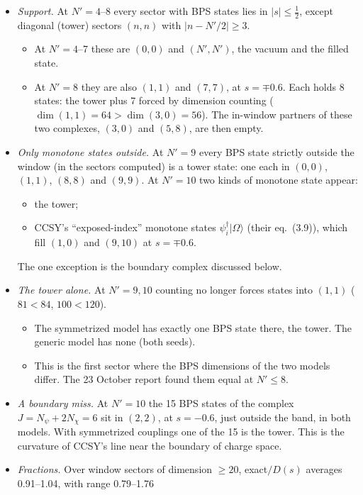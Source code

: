 \documentclass[11pt]{article}
\newcommand{\Np}{N'}
\newcommand{\Om}{|\Omega\rangle}
\theoremstyle{plain}
\theoremstyle{remark}
\numberwithin{equation}{section}
\begin{document}
\begin{itemize}\itemsep2pt
\item \emph{Support.} At $\Np=4$--8 every sector with BPS states lies in $|s|\le\tfrac12$, except diagonal (tower)
  sectors $(n,n)$ with $|n-\Np/2|\ge3$.
  \begin{itemize}\itemsep1pt
  \item At $\Np=4$--7 these are $(0,0)$ and $(\Np,\Np)$, the vacuum and the filled state.
  \item At $\Np=8$ they are also $(1,1)$ and $(7,7)$, at $s=\mp0.6$. Each holds 8 states: the tower plus 7 forced by
    dimension counting ($\dim(1,1)=64>\dim(3,0)=56$). The in-window partners of these two complexes, $(3,0)$ and $(5,8)$,
    are then empty.
  \end{itemize}
\item \emph{Only monotone states outside.} At $\Np=9$ every BPS state strictly outside the window (in the sectors computed)
  is a tower state: one each in $(0,0)$, $(1,1)$, $(8,8)$ and $(9,9)$. At $\Np=10$ two kinds of monotone state appear:
  \begin{itemize}\itemsep1pt
  \item the tower;
  \item CCSY's ``exposed-index'' monotone states $\psi_i^\dagger\Om$ (their eq.~(3.9)), which fill $(1,0)$ and $(9,10)$ at
    $s=\mp0.6$.
  \end{itemize}
  The one exception is the boundary complex discussed below.
\item \emph{The tower alone.} At $\Np=9,10$ counting no longer forces states into $(1,1)$ ($81<84$, $100<120$).
  \begin{itemize}\itemsep1pt
  \item The symmetrized model has exactly one BPS state there, the tower. The generic model has none (both seeds).
  \item This is the first sector where the BPS dimensions of the two models differ. The 23 October report found them
    equal at $\Np\le8$.
  \end{itemize}
\item \emph{A boundary miss.} At $\Np=10$ the 15 BPS states of the complex $J=N_\psi+2N_\chi=6$ sit in $(2,2)$, at
  $s=-0.6$, just outside the band, in both models. With symmetrized couplings one of the 15 is the tower. This is the
  curvature of CCSY's line near the boundary of charge space.
\item \emph{Fractions.} Over window sectors of dimension $\ge20$, exact$/D(s)$ averages 0.91--1.04, with range 0.79--1.76

\end{itemize}
\end{document}
